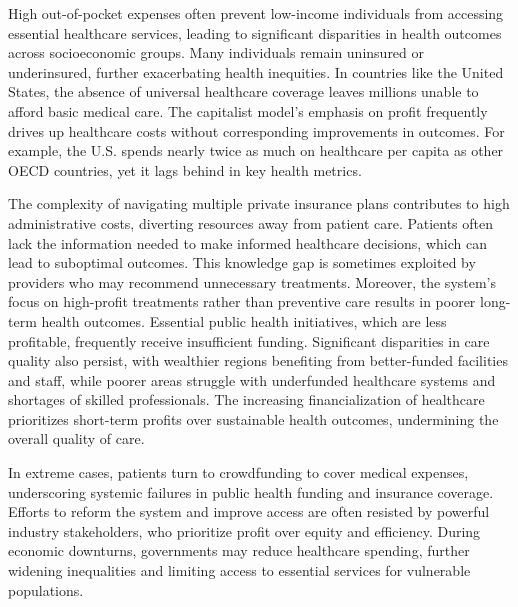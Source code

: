 \par
High out-of-pocket expenses often prevent low-income individuals from accessing essential healthcare services, leading to significant disparities in health outcomes across socioeconomic groups. Many individuals remain uninsured or underinsured, further exacerbating health inequities. In countries like the United States, the absence of universal healthcare coverage leaves millions unable to afford basic medical care. The capitalist model’s emphasis on profit frequently drives up healthcare costs without corresponding improvements in outcomes. For example, the U.S. spends nearly twice as much on healthcare per capita as other OECD countries, yet it lags behind in key health metrics. 

\par
The complexity of navigating multiple private insurance plans contributes to high administrative costs, diverting resources away from patient care. Patients often lack the information needed to make informed healthcare decisions, which can lead to suboptimal outcomes. This knowledge gap is sometimes exploited by providers who may recommend unnecessary treatments. Moreover, the system's focus on high-profit treatments rather than preventive care results in poorer long-term health outcomes. Essential public health initiatives, which are less profitable, frequently receive insufficient funding. Significant disparities in care quality also persist, with wealthier regions benefiting from better-funded facilities and staff, while poorer areas struggle with underfunded healthcare systems and shortages of skilled professionals. The increasing financialization of healthcare prioritizes short-term profits over sustainable health outcomes, undermining the overall quality of care.

\par
In extreme cases, patients turn to crowdfunding to cover medical expenses, underscoring systemic failures in public health funding and insurance coverage. Efforts to reform the system and improve access are often resisted by powerful industry stakeholders, who prioritize profit over equity and efficiency. During economic downturns, governments may reduce healthcare spending, further widening inequalities and limiting access to essential services for vulnerable populations.